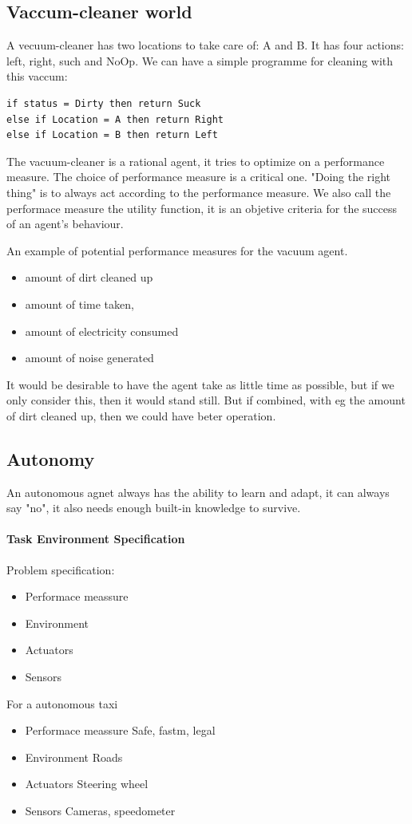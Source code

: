 \documentclass{article}
\begin{document}
\subsection{Vaccum-cleaner world}%
\label{sub:vaccum_cleaner_world}
A vecuum-cleaner has two locations to take care of: A and B. It has four
actions: left, right, such and NoOp. We can have a simple programme for cleaning
with this vaccum:

\begin{lstlisting}
if status = Dirty then return Suck
else if Location = A then return Right
else if Location = B then return Left
\end{lstlisting}

The vacuum-cleaner is a rational agent, it tries to optimize on a performance
measure. The choice of performance measure is a critical one. "Doing the right
thing" is to always act according to the performance measure. We also call the
performace measure the utility function, it is an objetive criteria for the
success of an agent's behaviour.

An example of potential performance measures for the vacuum agent.
\begin{itemize}
  \item amount of dirt cleaned up
  \item amount of time taken,
  \item amount of electricity consumed
  \item amount of noise generated
\end{itemize}
It would be desirable to have the agent take as little time as possible, but if
we only consider this, then it would stand still. But if combined, with eg the
amount of dirt cleaned up, then we could have beter operation.

\subsection{Autonomy}%
\label{sub:autonomy}
An autonomous agnet always has the ability to learn and adapt, it can always say
"no", it also needs enough built-in knowledge to survive.

\paragraph{Task Environment Specification}
Problem specification:
\begin{itemize}
  \item Performace meassure
  \item Environment
  \item Actuators
  \item Sensors
\end{itemize}
For a autonomous taxi
\begin{itemize}
  \item Performace meassure
    \subitem Safe, fastm, legal
  \item Environment
    \subitem Roads
  \item Actuators
    \subitem Steering wheel
  \item Sensors
    \subitem Cameras, speedometer
\end{itemize}
\end{document}
